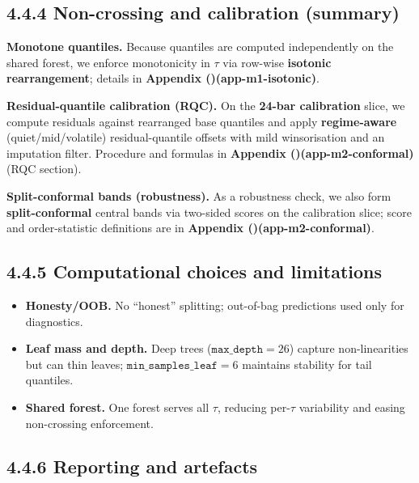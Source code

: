 \documentclass[
  a4paper,
  DIV=11,
  numbers=noendperiod]{scrreprt}
\providecommand{\tightlist}{%
  \setlength{\itemsep}{0pt}\setlength{\parskip}{0pt}}
\begin{document}
\subsection{4.4.4 Non-crossing and calibration
(summary)}\label{non-crossing-and-calibration-summary}

\textbf{Monotone quantiles.} Because quantiles are computed
independently on the shared forest, we enforce monotonicity in \(\tau\)
via row-wise \textbf{isotonic rearrangement}; details in
\textbf{Appendix ()(app-m1-isotonic)}.

\textbf{Residual-quantile calibration (RQC).} On the \textbf{24-bar
calibration} slice, we compute residuals against rearranged base
quantiles and apply \textbf{regime-aware} (quiet/mid/volatile)
residual-quantile offsets with mild winsorisation and an imputation
filter. Procedure and formulas in \textbf{Appendix
()(app-m2-conformal)} (RQC section).

\textbf{Split-conformal bands (robustness).} As a robustness check, we
also form \textbf{split-conformal} central bands via two-sided scores on
the calibration slice; score and order-statistic definitions are in
\textbf{Appendix ()(app-m2-conformal)}.

\subsection{4.4.5 Computational choices and
limitations}\label{computational-choices-and-limitations}

\begin{itemize}
\tightlist
\item
  \textbf{Honesty/OOB.} No ``honest'' splitting; out-of-bag predictions
  used only for diagnostics.
\item
  \textbf{Leaf mass and depth.} Deep trees (\(\texttt{max\_depth}=26\))
  capture non-linearities but can thin leaves;
  \(\texttt{min\_samples\_leaf}=6\) maintains stability for tail
  quantiles.
\item
  \textbf{Shared forest.} One forest serves all \(\tau\), reducing
  per-\(\tau\) variability and easing non-crossing enforcement.
\end{itemize}

\subsection{4.4.6 Reporting and
artefacts}\label{reporting-and-artefacts}
\end{document}
